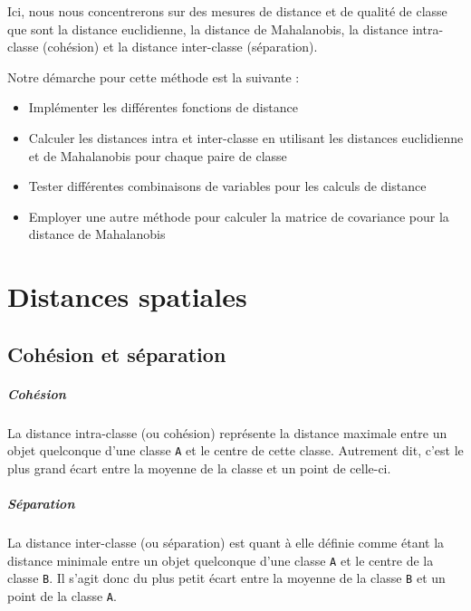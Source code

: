 \documentclass[french]{report}
\begin{document}
    Ici, nous nous concentrerons sur des mesures de distance et de qualité de classe que sont la distance euclidienne, la distance de Mahalanobis, la distance intra-classe (cohésion) et la distance inter-classe (séparation).
    
    \noindent Notre démarche pour cette méthode est la suivante :
    
    \begin{itemize}
        \item Implémenter les différentes fonctions de distance
        \item Calculer les distances intra et inter-classe en utilisant les distances euclidienne et de Mahalanobis pour chaque paire de classe
        \item Tester différentes combinaisons de variables pour les calculs de distance
        \item Employer une autre méthode pour calculer la matrice de covariance pour la distance de Mahalanobis
    \end{itemize}
    
    \chapter{Distances spatiales}
    
    \section{Cohésion et séparation}
    
    \paragraph{Cohésion}
    La distance intra-classe (ou cohésion) représente la distance maximale entre un objet quelconque d'une classe \texttt{A} et le centre de cette classe.
    Autrement dit, c'est le plus grand écart entre la moyenne de la classe et un point de celle-ci.
    
    \paragraph{Séparation}
    La distance inter-classe (ou séparation) est quant à elle définie comme étant la distance minimale entre un objet quelconque d'une classe \texttt{A} et le centre de la classe \texttt{B}.
    Il s'agit donc du plus petit écart entre la moyenne de la classe \texttt{B} et un point de la classe \texttt{A}.
    
\end{document}

